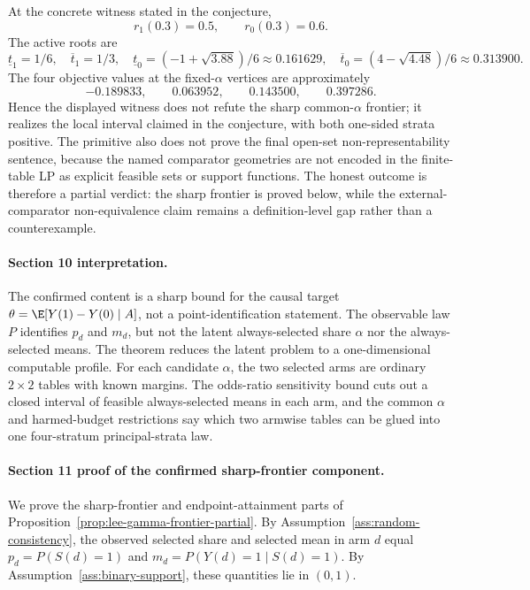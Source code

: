At the concrete witness stated in the conjecture,
\[
  r_1(0.3)=0.5,\qquad r_0(0.3)=0.6.
\]
The active roots are
\[
  \underline t_1=1/6,\quad \overline t_1=1/3,\quad
  \underline t_0=(-1+\sqrt{3.88})/6\approx 0.161629,\quad
  \overline t_0=(4-\sqrt{4.48})/6\approx 0.313900 .
\]
The four objective values at the fixed-\(\alpha\) vertices are approximately
\[
  -0.189833,\qquad 0.063952,\qquad 0.143500,\qquad 0.397286 .
\]
Hence the displayed witness does not refute the sharp common-\(\alpha\)
frontier; it realizes the local interval claimed in the conjecture, with both
one-sided strata positive.  The primitive also does not prove the final
open-set non-representability sentence, because the named comparator
geometries are not encoded in the finite-table LP as explicit feasible sets or
support functions.  The honest outcome is therefore a partial verdict: the
sharp frontier is proved below, while the external-comparator non-equivalence
claim remains a definition-level gap rather than a counterexample.

\paragraph{Section 10 interpretation.}
The confirmed content is a sharp bound for the causal target
\(\theta=\E[Y(1)-Y(0)\mid A]\), not a point-identification statement.  The
observable law \(P\) identifies \(p_d\) and \(m_d\), but not the latent
always-selected share \(\alpha\) nor the always-selected means.  The theorem
reduces the latent problem to a one-dimensional computable profile.  For each
candidate \(\alpha\), the two selected arms are ordinary \(2\times2\) tables
with known margins.  The odds-ratio sensitivity bound cuts out a closed
interval of feasible always-selected means in each arm, and the common
\(\alpha\) and harmed-budget restrictions say which two armwise tables can be
glued into one four-stratum principal-strata law.

\paragraph{Section 11 proof of the confirmed sharp-frontier component.}
We prove the sharp-frontier and endpoint-attainment parts of
Proposition~\ref{prop:lee-gamma-frontier-partial}.  By
Assumption~\ref{ass:random-consistency}, the observed selected share and
selected mean in arm \(d\) equal \(p_d=P(S(d)=1)\) and
\(m_d=P(Y(d)=1\mid S(d)=1)\).  By Assumption~\ref{ass:binary-support}, these
quantities lie in \((0,1)\).

